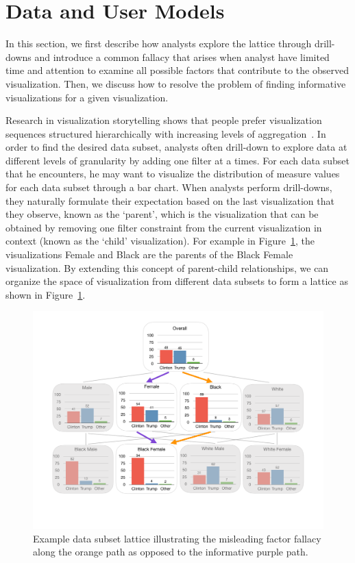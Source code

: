 \section{Data and User Models\label{sec:datamodel}}
\par In this section, we first describe how analysts explore the lattice through drill-downs and introduce a common fallacy that arises when analyst have limited time and attention to examine all possible factors that contribute to the observed visualization. Then, we discuss how to resolve the problem of finding informative visualizations for a given visualization.
\par Research in visualization storytelling shows that people prefer visualization sequences structured hierarchically with increasing levels of aggregation~\cite{Kim2017,Hullman2017,Hullman2013}. In order to find the desired data subset, analysts often drill-down to explore data at different levels of granularity by adding one filter at a times. For each data subset that he encounters, he may want to visualize the distribution of measure values for each data subset through a bar chart. When analysts perform drill-downs, they naturally formulate their expectation based on the last visualization that they observe, known as the `parent', which is the visualization that can be obtained by removing one filter constraint from the current visualization in context (known as the `child' visualization). For example in Figure~\ref{fig:elections_example}, the visualizations Female and Black are the parents of the Black Female visualization. By extending this concept of parent-child relationships, we can organize the space of visualization from different data subsets to form a lattice as shown in Figure~\ref{fig:elections_example}.
\begin{figure}[h!]
\includegraphics[width=\linewidth]{figures/elections_example_lattice.pdf}
\caption{Example data subset lattice illustrating the misleading factor fallacy along the orange path as opposed to the informative purple path.}
\label{fig:elections_example}
\end{figure}
